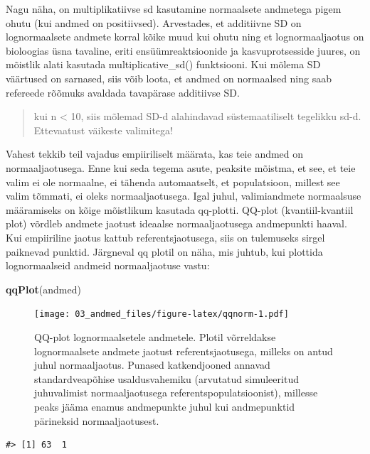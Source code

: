 \documentclass[]{book}
\newenvironment{Shaded}{\begin{snugshade}}{\end{snugshade}}
\newcommand{\KeywordTok}[1]{\textcolor[rgb]{0.13,0.29,0.53}{\textbf{#1}}}
\newcommand{\NormalTok}[1]{#1}
\begin{document}
Nagu näha, on multiplikatiivse sd kasutamine normaalsete andmetega pigem
ohutu (kui andmed on positiivsed). Arvestades, et additiivne SD on
lognormaalsete andmete korral kõike muud kui ohutu ning et
lognormaaljaotus on bioloogias üsna tavaline, eriti ensüümreaktsioonide
ja kasvuprotsesside juures, on mõistlik alati kasutada
multiplicative\_sd() funktsiooni. Kui mõlema SD väärtused on sarnased,
siis võib loota, et andmed on normaalsed ning saab refereede rõõmuks
avaldada tavapärase additiivse SD.

\begin{quote}
kui n \textless{} 10, siis mõlemad SD-d alahindavad süstemaatiliselt
tegelikku sd-d. Ettevaatust väikeste valimitega!
\end{quote}

Vahest tekkib teil vajadus empiiriliselt määrata, kas teie andmed on
normaaljaotusega. Enne kui seda tegema asute, peaksite mõistma, et see,
et teie valim ei ole normaalne, ei tähenda automaatselt, et
populatsioon, millest see valim tõmmati, ei oleks normaaljaotusega. Igal
juhul, valimiandmete normaalsuse määramiseks on kõige mõistlikum
kasutada qq-plotti. QQ-plot (kvantiil-kvantiil plot) võrdleb andmete
jaotust ideaalse normaaljaotusega andmepunkti haaval. Kui empiiriline
jaotus kattub referentsjaotusega, siis on tulemuseks sirgel paiknevad
punktid. Järgneval qq plotil on näha, mis juhtub, kui plottida
lognormaalseid andmeid normaaljaotuse vastu:








\begin{Shaded}
\begin{Highlighting}[]
\KeywordTok{qqPlot}\NormalTok{(andmed)}
\end{Highlighting}
\end{Shaded}

\begin{figure}
\centering
\texttt{[image: 03\_andmed\_files/figure-latex/qqnorm-1.pdf]}
\caption{\label{fig:qqnorm}QQ-plot lognormaalsetele andmetele. Plotil võrreldakse
lognormaalsete andmete jaotust referentsjaotusega, milleks on antud
juhul normaaljaotus. Punased katkendjooned annavad standardveapõhise
usaldusvahemiku (arvutatud simuleeritud juhuvalimist normaaljaotusega
referentspopulatsioonist), millesse peaks jääma enamus andmepunkte juhul
kui andmepunktid pärineksid normaaljaotusest.}
\end{figure}

\begin{verbatim}
#> [1] 63  1
\end{verbatim}
\end{document}
